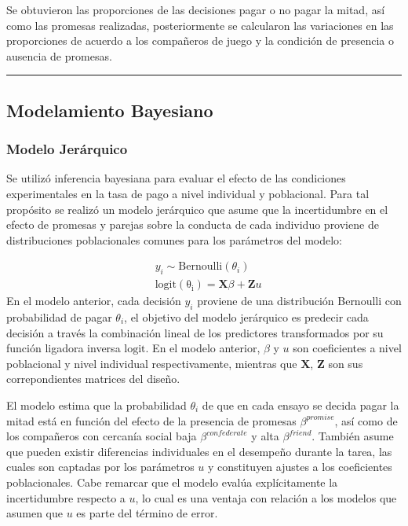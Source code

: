 \documentclass[12pt,]{article}
\begin{document}
Se obtuvieron las proporciones de las decisiones pagar o no pagar la
mitad, así como las promesas realizadas, posteriormente se calcularon
las variaciones en las proporciones de acuerdo a los compañeros de juego
y la condición de presencia o ausencia de promesas.

\begin{center}\rule{0.5\linewidth}{\linethickness}\end{center}

\subsection{Modelamiento Bayesiano}\label{modelamiento-bayesiano}

\subsubsection{Modelo Jerárquico}\label{modelo-jerarquico}

Se utilizó inferencia bayesiana para evaluar el efecto de las
condiciones experimentales en la tasa de pago a nivel individual y
poblacional. Para tal propósito se realizó un modelo jerárquico que
asume que la incertidumbre en el efecto de promesas y parejas sobre la
conducta de cada individuo proviene de distribuciones poblacionales
comunes para los parámetros del modelo:

\[
\begin{aligned}
&y_i \sim \mathrm{Bernoulli}(\theta_i) \\
&\mathrm{logit(\theta_i)} = \mathbf{X}\beta  +  \mathbf{Z}u
\end{aligned}
\] En el modelo anterior, cada decisión \(y_i\) proviene de una
distribución Bernoulli con probabilidad de pagar \(\theta_i\), el
objetivo del modelo jerárquico es predecir cada decisión a través la
combinación lineal de los predictores transformados por su función
ligadora inversa \(\mathrm{logit}\). En el modelo anterior, \(\beta\) y
\(u\) son coeficientes a nivel poblacional y nivel individual
respectivamente, mientras que \(\mathbf{X}\), \(\mathbf{Z}\) son sus
correpondientes matrices del diseño.

El modelo estima que la probabilidad \(\theta_i\) de que en cada ensayo
se decida pagar la mitad está en función del efecto de la presencia de
promesas \(\beta^{promise}\), así como de los compañeros con cercanía
social baja \(\beta^{confederate}\) y alta \(\beta^{friend}\). También
asume que pueden existir diferencias individuales en el desempeño
durante la tarea, las cuales son captadas por los parámetros \(u\) y
constituyen ajustes a los coeficientes poblacionales. Cabe remarcar que
el modelo evalúa explícitamente la incertidumbre respecto a \(u\), lo
cual es una ventaja con relación a los modelos que asumen que \(u\) es
parte del término de error.
\end{document}
